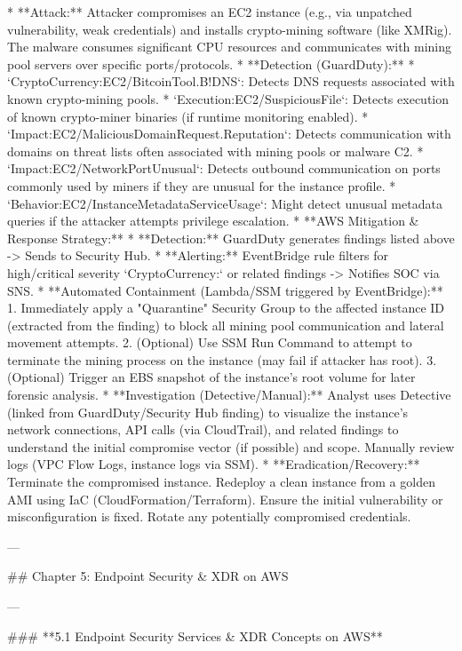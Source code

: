 \documentclass{article}
\begin{document}
* **Attack:** Attacker compromises an EC2 instance (e.g., via unpatched vulnerability, weak credentials) and installs crypto-mining software (like XMRig). The malware consumes significant CPU resources and communicates with mining pool servers over specific ports/protocols.
* **Detection (GuardDuty):**
    * `CryptoCurrency:EC2/BitcoinTool.B!DNS`: Detects DNS requests associated with known crypto-mining pools.
    * `Execution:EC2/SuspiciousFile`: Detects execution of known crypto-miner binaries (if runtime monitoring enabled).
    * `Impact:EC2/MaliciousDomainRequest.Reputation`: Detects communication with domains on threat lists often associated with mining pools or malware C2.
    * `Impact:EC2/NetworkPortUnusual`: Detects outbound communication on ports commonly used by miners if they are unusual for the instance profile.
    * `Behavior:EC2/InstanceMetadataServiceUsage`: Might detect unusual metadata queries if the attacker attempts privilege escalation.
* **AWS Mitigation & Response Strategy:**
    * **Detection:** GuardDuty generates findings listed above -> Sends to Security Hub.
    * **Alerting:** EventBridge rule filters for high/critical severity `CryptoCurrency:` or related findings -> Notifies SOC via SNS.
    * **Automated Containment (Lambda/SSM triggered by EventBridge):**
        1.  Immediately apply a "Quarantine" Security Group to the affected instance ID (extracted from the finding) to block all mining pool communication and lateral movement attempts.
        2.  (Optional) Use SSM Run Command to attempt to terminate the mining process on the instance (may fail if attacker has root).
        3.  (Optional) Trigger an EBS snapshot of the instance's root volume for later forensic analysis.
    * **Investigation (Detective/Manual):** Analyst uses Detective (linked from GuardDuty/Security Hub finding) to visualize the instance's network connections, API calls (via CloudTrail), and related findings to understand the initial compromise vector (if possible) and scope. Manually review logs (VPC Flow Logs, instance logs via SSM).
    * **Eradication/Recovery:** Terminate the compromised instance. Redeploy a clean instance from a golden AMI using IaC (CloudFormation/Terraform). Ensure the initial vulnerability or misconfiguration is fixed. Rotate any potentially compromised credentials.

---

## Chapter 5: Endpoint Security & XDR on AWS

---

### **5.1 Endpoint Security Services & XDR Concepts on AWS**
\end{document}
